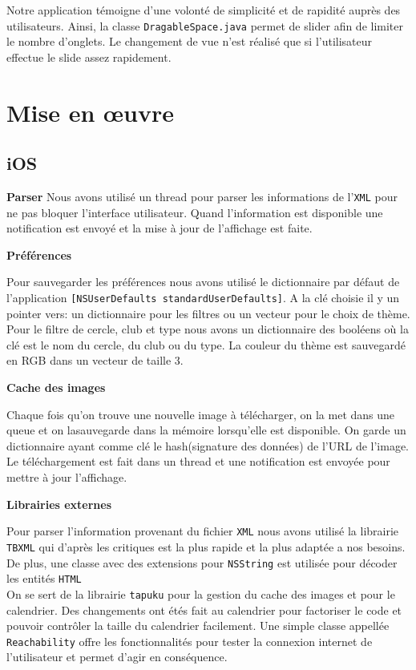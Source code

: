 \documentclass[a4paper, 11px]{article}
\begin{document}
Notre application témoigne d'une volonté de simplicité et de rapidité auprès des utilisateurs. Ainsi, la classe \texttt{DragableSpace.java} permet de \og slider \fg afin de limiter le nombre d'onglets. Le changement de vue n'est réalisé que si l'utilisateur effectue le slide assez rapidement.

\section{Mise en œuvre}

\subsection{iOS}
{\bf Parser}
Nous avons utilisé un thread pour parser les informations de l'\texttt{XML} pour ne pas bloquer l'interface utilisateur. Quand l'information est disponible une notification est envoyé et la mise à jour de l'affichage est faite.


{\bf Préférences}

Pour sauvegarder les préférences nous avons utilisé le dictionnaire par défaut de l'application 
\texttt{[NSUserDefaults standardUserDefaults]}. A la clé choisie il y un pointer vers: un dictionnaire pour les filtres ou un vecteur pour le choix de thème. Pour le filtre de cercle, club et type nous avons un dictionnaire des booléens où la clé est le nom du cercle, du club ou du type. La couleur du thème est sauvegardé en RGB dans un vecteur de taille 3. 
 
{\bf Cache des images}

Chaque fois qu'on trouve une nouvelle image à télécharger, on la met dans une queue et on lasauvegarde dans la mémoire lorsqu'elle est disponible. On garde un dictionnaire ayant comme clé le hash(signature des données) de l'URL de l'image. Le téléchargement est fait dans un thread et une notification est envoyée pour mettre à jour l'affichage.

{\bf Librairies externes}

Pour parser l'information provenant du fichier \texttt{XML} nous avons utilisé la librairie \texttt{TBXML} qui d'après les critiques est la plus rapide et la plus adaptée a nos besoins. De plus, une classe avec des extensions pour \texttt{NSString} est utilisée pour décoder les entités \texttt{HTML}\\
\indent On se sert de la librairie \texttt{tapuku} pour la gestion du cache des images et pour le calendrier. Des changements ont étés fait au calendrier pour factoriser le code et pouvoir contrôler la taille du calendrier facilement.
Une simple classe appellée \texttt{Reachability} offre les fonctionnalités pour tester la connexion internet de l'utilisateur et permet d'agir en conséquence.
\end{document}
